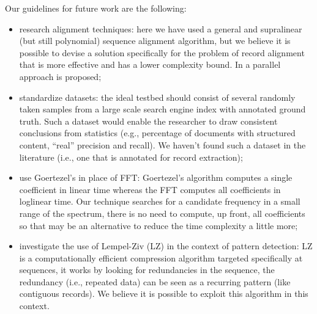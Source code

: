 \documentclass{vldb}
\begin{document}
Our guidelines for future work are the following:
\begin{itemize}
  \item research alignment techniques: here we have used a general and
  supralinear (but still polynomial) sequence alignment algorithm, but we
  believe it is possible to devise a solution specifically for the problem of
  record alignment that is more effective and has a lower complexity bound. In
  \cite{gfrerer2017parallel} a parallel approach is proposed;
  \item standardize datasets: the ideal testbed should consist of several
  randomly taken samples from a large scale search engine index with annotated
  ground truth.
  Such a dataset would enable the researcher to draw consistent conclusions
  from statistics (e.g., percentage of documents with structured content,
  ``real'' precision and recall). We haven't found such a dataset in the
  literature (i.e., one that is annotated for record extraction);
  \item use Goertezel's \cite{goertzel1958algorithm} in place of FFT:
  Goertezel's algorithm computes a single coefficient in linear time whereas the
  FFT computes all coefficients in loglinear time. Our technique searches for a
  candidate frequency in a small range of the spectrum, there is no need to
  compute, up front, all coefficients so that may be an alternative to reduce
  the time complexity a little more;
  \item investigate the use of Lempel-Ziv\cite{ziv1977universal} (LZ) in the
  context of pattern detection: LZ is a computationally efficient compression
  algorithm targeted specifically at sequences, it works by looking for
  redundancies in the sequence, the redundancy (i.e., repeated data) can be seen
  as a recurring pattern (like contiguous records). We believe it is
  possible to exploit this algorithm in this context.
\end{itemize}
 
\balance 



\end{document}
